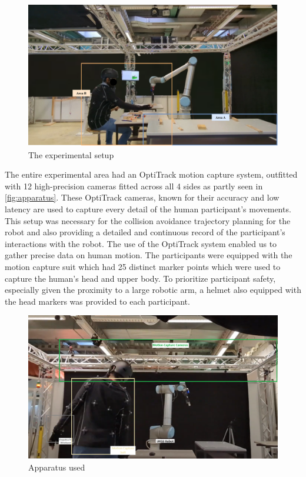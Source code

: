  
\begin{figure}[h] 

    \centering 

    \includegraphics[width=0.7\columnwidth]{images/handover.pdf} 

    \caption{The experimental setup} 

    \label{fig:setup} 

\end{figure} 



The entire experimental area had an OptiTrack motion capture system, outfitted with 12 high-precision cameras fitted across all 4 sides as partly seen in \autoref{fig:apparatus}. These OptiTrack cameras, known for their accuracy and low latency are used to capture every detail of the human participant's movements. This setup was necessary for the collision avoidance trajectory planning for the robot and also providing a detailed and continuous record of the participant's interactions with the robot. The use of the OptiTrack system enabled us to gather precise data on human motion. The participants were equipped with the motion capture suit which had 25 distinct marker points which were used to capture the human's head and upper body. To prioritize participant safety, especially given the proximity to a large robotic arm, a helmet also equipped with the head markers was provided to each participant.

\begin{figure}[hb]
	\centering
	\includegraphics[width=0.8\columnwidth]{images/apparatus.png}
	\caption{Apparatus used}
	\label{fig:apparatus}
\end{figure}

